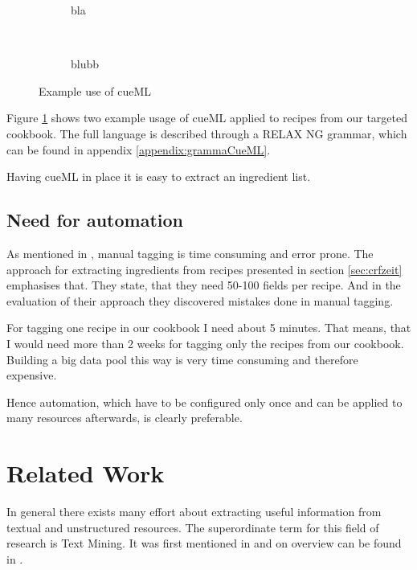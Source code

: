 \documentclass[12pt, twoside]{report}
\begin{document}
\begin{figure}[H]
	\begin{subfigure}{1\textwidth}
		\centering
		\caption{bla}
	\end{subfigure} \\
	\begin{subfigure}{1\textwidth}
		\centering
		\caption{blubb }
	\end{subfigure}
	\caption{Example use of cueML}
	\label{fig:exampleCueML}
\end{figure} 

Figure \ref{fig:exampleCueML} shows two example usage of cueML applied to recipes from our targeted cookbook. The full language is described through a RELAX NG grammar, which can be found in appendix \ref{appendix:grammaCueML}.

Having cueML in place it is easy to extract an ingredient list. 




\section{Need for automation}
As mentioned in \parencite{manualTagging}, manual tagging is time consuming and error prone. The approach for extracting ingredients from recipes presented in section \ref{sec:crfzeit} emphasises that. They state, that they need 50-100 fields per recipe. And in the evaluation of their approach they discovered mistakes done in manual tagging.

For tagging one recipe in our cookbook I need about 5 minutes. That means, that I would need more than 2 weeks for tagging only the recipes from our cookbook. Building a big data pool this way is very time consuming and therefore expensive.

Hence automation, which have to be configured only once and can be applied to many resources afterwards, is clearly preferable.



\chapter{Related Work}
In general there exists many effort about extracting useful information from textual and unstructured resources. The superordinate term for this field of research is Text Mining. It was first mentioned in \parencite{KDT} and on overview can be found in \parencite{surveyOfTextMining}. 
\end{document}
